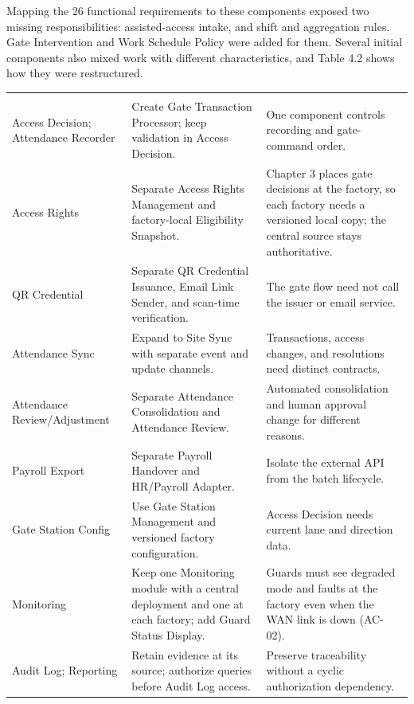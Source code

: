 Mapping the 26 functional requirements to these components exposed two missing responsibilities: assisted-access intake, and shift and aggregation rules. Gate Intervention and Work Schedule Policy were added for them. Several initial components also mixed work with different characteristics, and Table 4.2 shows how they were restructured.

\begin{longtable}{|>{\raggedright\arraybackslash}p{112pt}|>{\raggedright\arraybackslash}p{147pt}|>{\raggedright\arraybackslash}p{158pt}|}
\hline
\multicolumn{1}{|>{\columncolor{tableheader}\centering\arraybackslash}p{112pt}|}{\textbf{Initial responsibility}} & \multicolumn{1}{>{\columncolor{tableheader}\centering\arraybackslash}p{147pt}|}{\textbf{Change}} & \multicolumn{1}{>{\columncolor{tableheader}\centering\arraybackslash}p{158pt}|}{\textbf{Reason}} \\
\hline
\endhead
\multicolumn{3}{c}{\rule{0pt}{20pt}\normalsize\textbf{Table 4.2. Responsibility Analysis and Restructuring Decisions}} \\
\endlastfoot
Access Decision; Attendance Recorder & Create Gate Transaction Processor; keep validation in Access Decision. & One component controls recording and gate-command order. \\
\hline
Access Rights & Separate Access Rights Management and factory-local Eligibility Snapshot. & Chapter 3 places gate decisions at the factory, so each factory needs a versioned local copy; the central source stays authoritative. \\
\hline
QR Credential & Separate QR Credential Issuance, Email Link Sender, and scan-time verification. & The gate flow need not call the issuer or email service. \\
\hline
Attendance Sync & Expand to Site Sync with separate event and update channels. & Transactions, access changes, and resolutions need distinct contracts. \\
\hline
Attendance Review/Adjustment & Separate Attendance Consolidation and Attendance Review. & Automated consolidation and human approval change for different reasons. \\
\hline
Payroll Export & Separate Payroll Handover and HR/Payroll Adapter. & Isolate the external API from the batch lifecycle. \\
\hline
Gate Station Config & Use Gate Station Management and versioned factory configuration. & Access Decision needs current lane and direction data. \\
\hline
Monitoring & Keep one Monitoring module with a central deployment and one at each factory; add Guard Status Display. & Guards must see degraded mode and faults at the factory even when the WAN link is down (AC-02). \\*
\hline\noalign{\nobreak}
Audit Log; Reporting & Retain evidence at its source; authorize queries before Audit Log access. & Preserve traceability without a cyclic authorization dependency. \\
\hline
\end{longtable}


